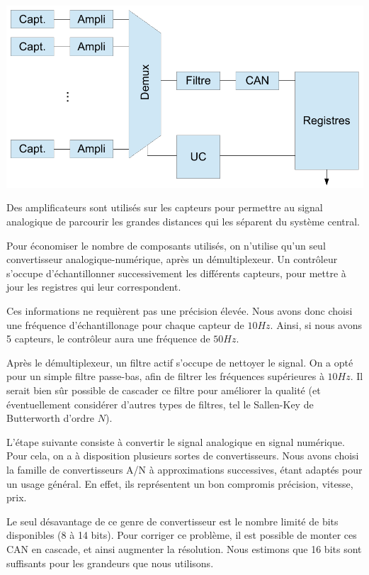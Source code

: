 \documentclass[a4paper]{article} %
\begin{document}
\begin{center}
\includegraphics[scale=0.6]{sensor.pdf}
\end{center}

Des amplificateurs sont utilisés sur les capteurs pour permettre au signal analogique de parcourir les grandes distances qui les séparent du système central.

Pour économiser le nombre de composants utilisés, on n'utilise qu'un seul convertisseur analogique-numérique, après un démultiplexeur.
Un contrôleur s'occupe d'échantillonner successivement les différents capteurs, pour mettre à jour les registres qui leur correspondent.

Ces informations ne requièrent pas une précision élevée.
Nous avons donc choisi une fréquence d'échantillonage pour chaque capteur de $10 H\!z$.
Ainsi, si nous avons 5 capteurs, le contrôleur aura une fréquence de $50 H\!z$.

Après le démultiplexeur, un filtre actif s'occupe de nettoyer le signal.
On a opté pour un simple filtre passe-bas, afin de filtrer les fréquences supérieures à $10 H\!z$.
Il serait bien sûr possible de cascader ce filtre pour améliorer la qualité (et éventuellement considérer d'autres types de filtres, tel le Sallen-Key de Butterworth d'ordre $N$).

L'étape suivante consiste à convertir le signal analogique en signal numérique.
Pour cela, on a à disposition plusieurs sortes de convertisseurs.
Nous avons choisi la famille de convertisseurs A/N à approximations successives, étant adaptés pour un usage général.
En effet, ils représentent un bon compromis précision, vitesse, prix.

Le seul désavantage de ce genre de convertisseur est le nombre limité de bits disponibles (8 à 14 bits).
Pour corriger ce problème, il est possible de monter ces CAN en cascade, et ainsi augmenter la résolution.
Nous estimons que 16 bits sont suffisants pour les grandeurs que nous utilisons.
\end{document}
